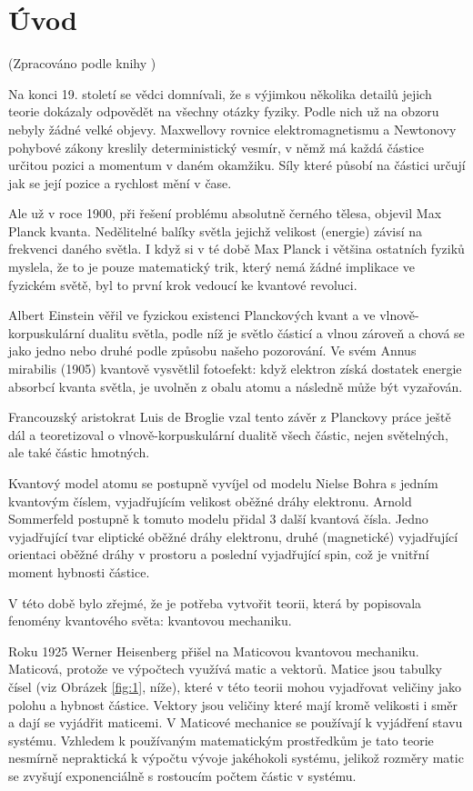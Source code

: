 \section{Úvod}
(Zpracováno podle knihy \cite{quantum})

Na konci 19. století se vědci domnívali, že s výjimkou několika detailů jejich teorie dokázaly odpovědět na všechny otázky fyziky. Podle nich už na obzoru nebyly žádné velké objevy. Maxwellovy rovnice elektromagnetismu a Newtonovy pohybové zákony kreslily deterministický vesmír, v němž má každá částice určitou pozici a momentum v daném okamžiku. Síly které působí na částici určují jak se její pozice a rychlost mění v čase.

Ale už v roce 1900, při řešení problému absolutně černého tělesa, objevil Max Planck kvanta. Nedělitelné balíky světla jejichž velikost (energie) závisí na frekvenci daného světla. I když si v té době Max Planck i většina ostatních fyziků myslela, že to je pouze matematický trik, který nemá žádné implikace ve fyzickém světě, byl to první krok vedoucí ke kvantové revoluci.

Albert Einstein věřil ve fyzickou existenci Planckových kvant a ve vlnově-korpusku\-lární dualitu světla, podle níž je světlo částicí a vlnou zároveň a chová se jako jedno nebo druhé podle způsobu našeho pozorování. Ve svém Annus mirabilis (1905) kvantově vysvětlil fotoefekt: když elektron získá dostatek energie absorbcí kvanta světla, je uvolněn z obalu atomu a následně může být vyzařován.

Francouzský aristokrat Luis de Broglie vzal tento závěr z Planckovy práce ještě dál a teoretizoval o vlnově-korpuskulární dualitě všech částic, nejen světelných, ale také částic hmotných.

Kvantový model atomu se postupně vyvíjel od modelu Nielse Bohra s jedním kvantovým číslem, vyjadřujícím velikost oběžné dráhy elektronu. Arnold Sommerfeld postupně k tomuto modelu přidal 3 další kvantová čísla. Jedno vyjadřující tvar eliptické oběžné dráhy elektronu, druhé (magnetické) vyjadřující orientaci oběžné dráhy v prostoru a poslední vyjadřující spin, což je vnitřní moment hybnosti částice.

V této době bylo zřejmé, že je potřeba vytvořit teorii, která by popisovala fenomény kvantového světa: kvantovou mechaniku.

Roku 1925 Werner Heisenberg přišel na Maticovou kvantovou mechaniku. Maticová, protože ve výpočtech využívá matic a vektorů. Matice jsou tabulky čísel (viz Obrázek \ref{fig:1}, níže), které v této teorii mohou vyjadřovat veličiny jako polohu a hybnost částice. Vektory jsou veličiny které mají kromě velikosti i směr a dají se vyjádřit maticemi. V Maticové mechanice se používají k vyjádření stavu systému. Vzhledem k používaným matematickým prostředkům je tato teorie nesmírně nepraktická k výpočtu vývoje jakéhokoli systému, jelikož rozměry matic se zvyšují exponenciálně s rostoucím počtem částic v systému.

